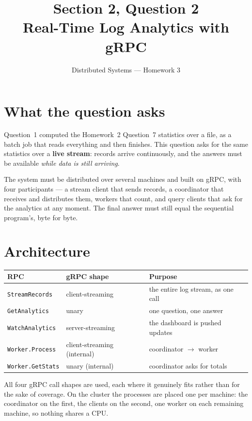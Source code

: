 \documentclass[11pt,a4paper]{article}
\title{\textbf{Section 2, Question 2}\\[0.3em]
       \large Real-Time Log Analytics with gRPC}
\author{Distributed Systems --- Homework 3}
\date{}
\begin{document}
\maketitle
\vspace{-2.5em}

\section{What the question asks}

Question~1 computed the Homework~2 Question~7 statistics over a file, as a batch
job that reads everything and then finishes. This question asks for the same
statistics over a \textbf{live stream}: records arrive continuously, and the
answers must be available \emph{while data is still arriving}.

The system must be distributed over several machines and built on gRPC, with
four participants --- a stream client that sends records, a coordinator that
receives and distributes them, workers that count, and query clients that ask
for the analytics at any moment. The final answer must still equal the
sequential program's, byte for byte.

\section{Architecture}

\begin{center}\small
\begin{tabular}{@{}lll@{}}
\toprule
\textbf{RPC} & \textbf{gRPC shape} & \textbf{Purpose} \\
\midrule
\texttt{StreamRecords} & client-streaming & the entire log stream, as one call \\
\texttt{GetAnalytics} & unary & one question, one answer \\
\texttt{WatchAnalytics} & server-streaming & the dashboard is pushed updates \\
\texttt{Worker.Process} & client-streaming (internal) & coordinator $\rightarrow$ worker \\
\texttt{Worker.GetStats} & unary (internal) & coordinator asks for totals \\
\bottomrule
\end{tabular}
\end{center}

All four gRPC call shapes are used, each where it genuinely fits rather than for
the sake of coverage. On the cluster the processes are placed one per machine:
the coordinator on the first, the clients on the second, one worker on each
remaining machine, so nothing shares a CPU.
\end{document}
